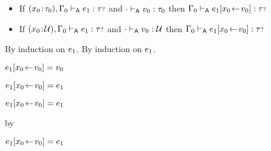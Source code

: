 \begin{lemma}\label{A-type-substitution}\leavevmode
  \begin{itemize}
    \item
      If\/ $(x_0\!:\!\tau_0),\Gamma_0 \vdash_{\mathsf{A}} e_1 : {\tau{\scriptstyle ?}}$
      and\/ ${\cdot} \vdash_{\mathsf{A}} v_0 : \tau_0$
      then\/ $\Gamma_0 \vdash_{\mathsf{A}} e_1[x_0\!\leftarrow\!v_0] : {\tau{\scriptstyle ?}}$
    \item
      If\/ $(x_0\!:\!{\mathcal U}),\Gamma_0 \vdash_{\mathsf{A}} e_1 : {\tau{\scriptstyle ?}}$
      and\/ ${\cdot} \vdash_{\mathsf{A}} v_0 : {\mathcal U}$
      then\/ $\Gamma_0 \vdash_{\mathsf{A}} e_1[x_0\!\leftarrow\!v_0] : {\tau{\scriptstyle ?}}$
  \end{itemize}
\end{lemma}{
  \newcommand{\shortpf}{By induction on $\sexpr_1$.}
\begin{lamportproof*}
  \shortpf
\mainproof
  \shortpf

    \begin{pfproof}
        \begin{pfproof}
          \qedstep
            \begin{pfproof}
              {$e_1[x_0\!\leftarrow\!v_0] = v_0$}
            \end{pfproof}
        \end{pfproof}
        \begin{pfproof}
          \qedstep
            \begin{pfproof}
              {$e_1[x_0\!\leftarrow\!v_0] = e_1$}
            \end{pfproof}
        \end{pfproof}
    \end{pfproof}

    \begin{pfproof}
      \qedstep
        \begin{pfproof}
          {$e_1[x_0\!\leftarrow\!v_0] = e_1$}
        \end{pfproof}
    \end{pfproof}

    \begin{pfproof}
        \begin{pfproof}
          \qedstep
            \begin{pfproof}
              by \pfih
            \end{pfproof}
        \end{pfproof}
        \begin{pfproof}
          \qedstep
            \begin{pfproof}
              {$e_1[x_0\!\leftarrow\!v_0] = e_1$}
            \end{pfproof}
        \end{pfproof}
    \end{pfproof}


\end{lamportproof*}}
